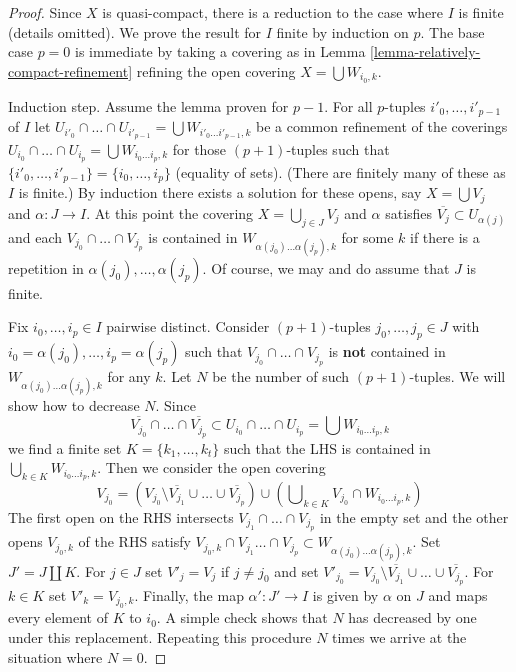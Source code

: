 \begin{proof}
Since $X$ is quasi-compact, there is a reduction to the
case where $I$ is finite (details omitted).
We prove the result for $I$ finite by induction on $p$.
The base case $p = 0$ is immediate by taking a covering as in
Lemma \ref{lemma-relatively-compact-refinement}
refining the open covering $X = \bigcup W_{i_0, k}$.

\medskip\noindent
Induction step. Assume the lemma proven for $p - 1$.
For all $p$-tuples $i'_0, \ldots, i'_{p - 1}$ of $I$ let
$U_{i'_0} \cap \ldots \cap U_{i'_{p - 1}} =
\bigcup W_{i'_0 \ldots i'_{p - 1}, k}$
be a common refinement of the coverings
$U_{i_0} \cap \ldots \cap U_{i_p} = \bigcup W_{i_0 \ldots i_p, k}$
for those $(p + 1)$-tuples such that
$\{i'_0, \ldots, i'_{p - 1}\} = \{i_0, \ldots, i_p\}$ (equality of sets).
(There are finitely many of these as $I$ is finite.)
By induction there exists a solution for these opens, say
$X = \bigcup V_j$ and $\alpha : J \to I$.
At this point the covering $X = \bigcup_{j \in J} V_j$
and $\alpha$ satisfies $\overline{V_j} \subset U_{\alpha(j)}$
and each $V_{j_0} \cap \ldots \cap V_{j_p}$
is contained in $W_{\alpha(j_0) \ldots \alpha(j_p), k}$
for some $k$ if there is a repetition in $\alpha(j_0), \ldots, \alpha(j_p)$.
Of course, we may and do assume that $J$ is finite.

\medskip\noindent
Fix $i_0, \ldots, i_p \in I$ pairwise distinct. Consider $(p + 1)$-tuples
$j_0, \ldots, j_p \in J$ with $i_0 = \alpha(j_0), \ldots, i_p = \alpha(j_p)$
such that $V_{j_0} \cap \ldots \cap V_{j_p}$
is {\bf not} contained in $W_{\alpha(j_0) \ldots \alpha(j_p), k}$ for any $k$.
Let $N$ be the number of such $(p + 1)$-tuples. We will show how to decrease
$N$. Since
$$
\overline{V_{j_0}} \cap \ldots \cap \overline{V_{j_p}} \subset
U_{i_0} \cap \ldots \cap U_{i_p} = \bigcup W_{i_0 \ldots i_p, k}
$$
we find a finite set $K = \{k_1, \ldots, k_t\}$ such that the LHS
is contained in $\bigcup_{k \in K} W_{i_0 \ldots i_p, k}$.
Then we consider the open covering
$$
V_{j_0} =
(V_{j_0} \setminus \overline{V_{j_1}} \cup \ldots \cup \overline{V_{j_p}})
\cup (\bigcup\nolimits_{k \in K} V_{j_0} \cap W_{i_0 \ldots i_p, k})
$$
The first open on the RHS intersects $V_{j_1} \cap \ldots \cap V_{j_p}$
in the empty set and the other opens $V_{j_0, k}$ of the RHS
satisfy $V_{j_0, k} \cap V_{j_1} \ldots \cap V_{j_p} \subset
W_{\alpha(j_0) \ldots \alpha(j_p), k}$.
Set $J' = J \amalg K$. For $j \in J$ set $V'_j = V_j$ if $j \not = j_0$
and set $V'_{j_0} =
V_{j_0} \setminus  \overline{V_{j_1}} \cup \ldots \cup \overline{V_{j_p}}$.
For $k \in K$ set $V'_k = V_{j_0, k}$. Finally, the map $\alpha' : J' \to I$
is given by $\alpha$ on $J$ and maps every element of $K$ to $i_0$.
A simple check shows that $N$ has decreased by one under this replacement.
Repeating this procedure $N$ times we arrive at the situation where
$N = 0$.


\end{proof}
